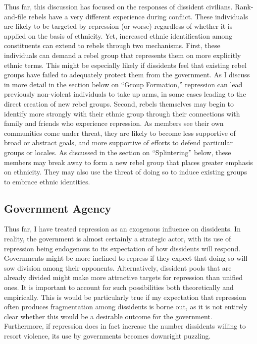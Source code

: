 \documentclass[12pt,]{book}
\theoremstyle{definition}
\theoremstyle{definition}
\theoremstyle{definition}
\theoremstyle{remark}
\begin{document}
Thus far, this discussion has focused on the responses of dissident
civilians. Rank-and-file rebels have a very different experience during
conflict. These individuals are likely to be targeted by repression (or
worse) regardless of whether it is applied on the basis of ethnicity.
Yet, increased ethnic identification among constituents can extend to
rebels through two mechanisms. First, these individuals can demand a
rebel group that represents them on more explicitly ethnic terms. This
might be especially likely if dissidents feel that existing rebel groups
have failed to adequately protect them from the government. As I discuss
in more detail in the section below on ``Group Formation,'' repression
can lead previously non-violent individuals to take up arms, in some
cases leading to the direct creation of new rebel groups. Second, rebels
themselves may begin to identify more strongly with their ethnic group
through their connections with family and friends who experience
repression. As members see their own communities come under threat, they
are likely to become less supportive of broad or abstract goals, and
more supportive of efforts to defend particular groups or locales. As
discussed in the section on ``Splintering'' below, these members may
break away to form a new rebel group that places greater emphasis on
ethnicity. They may also use the threat of doing so to induce existing
groups to embrace ethnic identities.

\hypertarget{government-agency}{%
\subsection{Government Agency}\label{government-agency}}

Thus far, I have treated repression as an exogenous influence on
dissidents. In reality, the government is almost certainly a strategic
actor, with its use of repression being endogenous to its expectation of
how dissidents will respond. Governments might be more inclined to
repress if they expect that doing so will sow division among their
opponents. Alternatively, dissident pools that are already divided might
make more attractive targets for repression than unified ones. It is
important to account for such possibilities both theoretically and
empirically. This is would be particularly true if my expectation that
repression often produces fragmentation among dissidents is borne out,
as it is not entirely clear whether this would be a desirable outcome
for the government. Furthermore, if repression does in fact increase the
number dissidents willing to resort violence, its use by governments
becomes downright puzzling.
\end{document}
